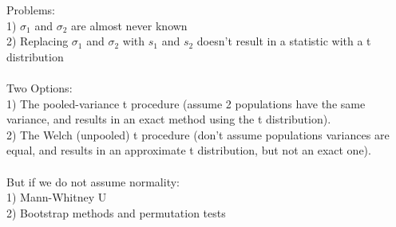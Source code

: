 \documentclass[12pt, a4paper]{article}
\begin{document}
	Problems: \\
	1) $\sigma_1$ and $\sigma_2$ are almost never known \\
	2) Replacing $\sigma_1$ and $\sigma_2$ with $s_1$ and $s_2$ doesn't result in a statistic with a t distribution \\~\\
	Two Options: \\
	1) The pooled-variance t procedure (assume 2 populations have the same variance, and results \hspace*{4mm} in an exact method using the t distribution). \\
	2) The Welch (unpooled) t procedure (don't assume populations variances are equal, and results \hspace*{4mm} in an approximate t distribution, but not an exact one). \\~\\
	But if we do not assume normality: \\
	1) Mann-Whitney U \\
	2) Bootstrap methods and permutation tests \newpage
	
\end{document}
